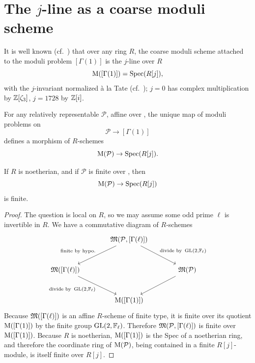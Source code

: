 \section{The $j$-line as a coarse moduli scheme}
\label{sec:8.2}

\kmitem\label{item:8.2.1}
It is well known (cf.\ \cite[\S2]{Ig3}) that over any ring $R$, the coarse moduli scheme attached to the moduli problem $[\Gamma(1)]$ is the $j$-line over $R$
\[
\mathrm{M}([\Gamma(1)]) = \operatorname{Spec}(R[j]) ,
\]
with the $j$-invariant normalized \`a la Tate (cf.\ \cite{De2}); $j = 0$ has complex multiplication by $\mathbb{Z}[\zeta_3]$, $j = 1728$ by $\mathbb{Z}[i]$.

For any relatively representable $\mathcal{P}$, affine over \EllR, the unique map of moduli problems on \EllR
\[
\mathcal{P} \to [\Gamma(1)]
\]
defines a morphism of $R$-schemes
\[
\mathrm{M}(\mathcal{P}) \to \operatorname{Spec}(R[j]) .
\]

\begin{kprop}\label{prop:8.2.2}
If $R$ is noetherian, and if $\mathcal{P}$ is finite over \EllR, then
\[
\mathrm{M}(\mathcal{P}) \to \operatorname{Spec}(R[j])
\]
is finite.
\end{kprop}

\begin{proof}
The question is local on $R$, so we may assume some odd prime $\ell$ is invertible in $R$. We have a commutative diagram of $R$-schemes
\[
\begin{tikzcd}[column sep=large, row sep=large]
& \Mfrak(\mathcal{P}, [\Gamma(\ell)]) \arrow[ld, "{\text{finite by hypo.}}"'] \arrow[rd, "{\text{divide by } \GL(2,\F_\ell)}"] & \\
\Mfrak([\Gamma(\ell)]) \arrow[rd, "{\text{divide by } \GL(2,\F_\ell)}"'] & & \Mfrak(\mathcal{P}) \arrow[ld] \\
& \Mcoarse([\Gamma(1)]) &
\end{tikzcd}
\]
Because $\mathfrak{M}([\Gamma(\ell)])$ is an affine $R$-scheme of finite type, it is finite over its quotient $\mathrm{M}([\Gamma(1)])$ by the finite group $\operatorname{GL}(2, \mathbb{F}_\ell)$. Therefore $\mathfrak{M}(\mathcal{P}, [\Gamma(\ell)])$ is finite over $\mathrm{M}([\Gamma(1)])$. Because $R$ is noetherian, $\mathrm{M}([\Gamma(1)])$ is the Spec of a noetherian ring, and therefore the coordinate ring of $\mathrm{M}(\mathcal{P})$, being contained in a finite $R[j]$-module, is itself finite over $R[j]$.
\end{proof}

